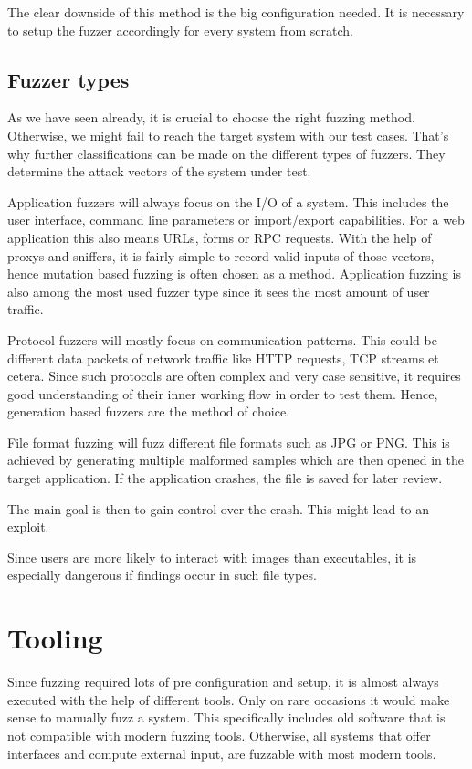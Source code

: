 \documentclass[journal=tosc,final]{iacrtrans}
\begin{document}
The clear downside of this method is the big configuration needed. It is necessary to setup the fuzzer accordingly for every system from scratch. 
\subsection{Fuzzer types}
As we have seen already, it is crucial to choose the right fuzzing method. Otherwise, we might fail to reach the target system with our test cases. That's  why further classifications can be made on the different types of fuzzers. They determine the attack vectors of the system under test. 

Application fuzzers will always focus on the I/O of a system. This includes the user interface, command line parameters or import/export capabilities. For a web application this also means URLs, forms or RPC requests. With the help of proxys and sniffers, it is fairly simple to record valid inputs of those vectors, hence mutation based fuzzing is often chosen as a method. Application fuzzing  is also among the most used fuzzer type since it sees the most amount of user traffic.

Protocol fuzzers will mostly focus on communication patterns. This could be different data packets of network traffic like HTTP requests, TCP streams et cetera. Since such protocols are often complex and very case sensitive, it requires good understanding of their inner working flow in order to test them. Hence, generation based fuzzers are the method of choice.

File format fuzzing will fuzz different file formats such as JPG or PNG. This is achieved by generating multiple malformed samples which are then opened in the target application. 
If the application crashes, the file is saved for later review. 

The main goal is then to gain control over the crash. This might lead to an exploit.

Since users are more likely to interact with images than executables, it is especially dangerous if findings occur in such file types\cite{fuzzer}.
\section{Tooling}
Since fuzzing required lots of pre configuration and setup, it is almost always executed with the help of different tools. Only on rare occasions it would make sense to manually fuzz a system. This specifically includes old software that is not compatible with modern fuzzing tools. Otherwise, all systems that offer interfaces and compute external input, are fuzzable with most modern tools. 
\end{document}
